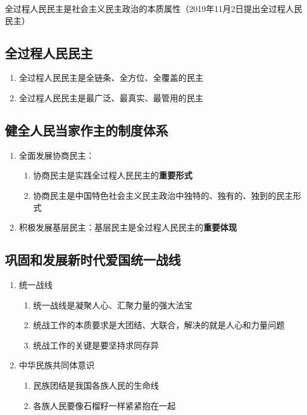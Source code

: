 \documentclass{ctexart}
\numberwithin{figure}{section}
\numberwithin{equation}{section}
\begin{document}
        全过程人民民主是社会主义民主政治的本质属性（2019年11月2日提出全过程人民民主）

    \subsection{全过程人民民主}
        \begin{enumerate}
            \item 全过程人民民主是全链条、全方位、全覆盖的民主
            \item 全过程人民民主是最广泛、最真实、最管用的民主
        \end{enumerate}
    \subsection{健全人民当家作主的制度体系}
        \begin{enumerate}
            \item 全面发展协商民主：
                \begin{enumerate}
                    \item 协商民主是实践全过程人民民主的\textbf{重要形式}
                    \item 协商民主是中国特色社会主义民主政治中独特的、独有的、独到的民主形式
                \end{enumerate}
            \item 积极发展基层民主：基层民主是全过程人民民主的\textbf{重要体现}
        \end{enumerate}
    \subsection{巩固和发展新时代爱国统一战线}
        \begin{enumerate}
            \item 统一战线
                \begin{enumerate}
                \item 统一战线是凝聚人心、汇聚力量的强大法宝
                \item 统战工作的本质要求是大团结、大联合，解决的就是人心和力量问题
                \item 统战工作的关键是要坚持求同存异
                \end{enumerate}
            \item 中华民族共同体意识
                \begin{enumerate}
                    \item 民族团结是我国各族人民的生命线
                    \item 各族人民要像石榴籽一样紧紧抱在一起
                \end{enumerate}
        \end{enumerate}
\end{document}
